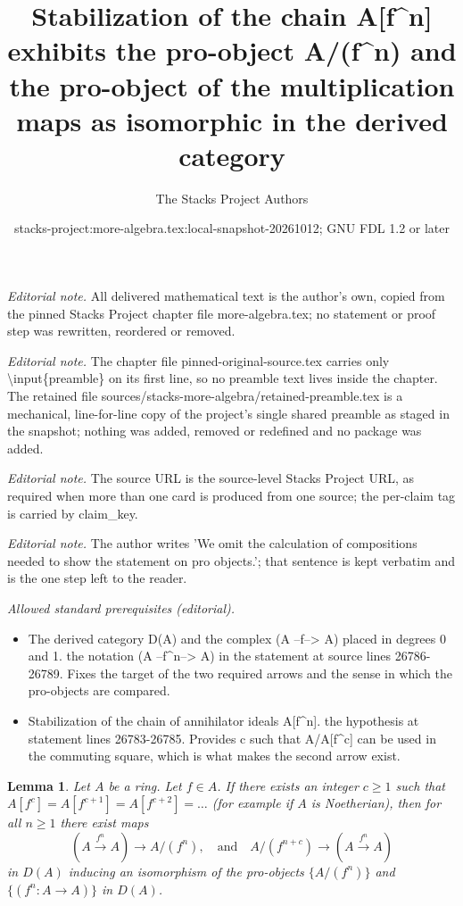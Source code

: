 \documentclass[10pt,a4paper]{amsart}
\title{Stabilization of the chain A[f\textasciicircum{}n] exhibits the pro-object A/(f\textasciicircum{}n) and the pro-object of the multiplication maps as isomorphic in the derived category}
\author{The Stacks Project Authors}
\date{stacks-project:more-algebra.tex:local-snapshot-20261012; GNU FDL 1.2 or later}
\theoremstyle{plain}
\newtheorem{lemma}[subsection]{Lemma}
\theoremstyle{definition}
\theoremstyle{remark}
\numberwithin{equation}{subsection}
\begin{document}
\maketitle
\setcounter{subsection}{1}
\noindent\textit{Editorial note.} All delivered mathematical text is the author's own, copied from the pinned Stacks Project chapter file more-algebra.tex; no statement or proof step was rewritten, reordered or removed.\par\medskip
\noindent\textit{Editorial note.} The chapter file pinned-original-source.tex carries only \textbackslash{}input\{preamble\} on its first line, so no preamble text lives inside the chapter. The retained file sources/stacks-more-algebra/retained-preamble.tex is a mechanical, line-for-line copy of the project's single shared preamble as staged in the snapshot; nothing was added, removed or redefined and no package was added.\par\medskip
\noindent\textit{Editorial note.} The source URL is the source-level Stacks Project URL, as required when more than one card is produced from one source; the per-claim tag is carried by claim\_key.\par\medskip
\noindent\textit{Editorial note.} The author writes 'We omit the calculation of compositions needed to show the statement on pro objects.'; that sentence is kept verbatim and is the one step left to the reader.\par\medskip
\noindent\textit{Allowed standard prerequisites (editorial).}\begin{itemize}
\item The derived category D(A) and the complex (A --f--> A) placed in degrees 0 and 1. the notation (A --f\textasciicircum{}n--> A) in the statement at source lines 26786-26789. Fixes the target of the two required arrows and the sense in which the pro-objects are compared.
\item Stabilization of the chain of annihilator ideals A[f\textasciicircum{}n]. the hypothesis at statement lines 26783-26785. Provides c such that A/A[f\textasciicircum{}c] can be used in the commuting square, which is what makes the second arrow exist.
\end{itemize}\medskip
\begin{lemma}
\label{lemma-lift-universally}
Let $A$ be a ring. Let $f \in A$. If there exists an integer $c \geq 1$
such that $A[f^c] = A[f^{c + 1}] = A[f^{c + 2}] = \ldots$ (for example
if $A$ is Noetherian), then for all $n \geq 1$ there exist maps
$$
(A \xrightarrow{f^n} A) \longrightarrow A/(f^n),
\quad\text{and}\quad
A/(f^{n + c}) \longrightarrow (A \xrightarrow{f^n} A)
$$
in $D(A)$ inducing an isomorphism of the pro-objects $\{A/(f^n)\}$ and
$\{(f^n : A \to A)\}$ in $D(A)$.
\end{lemma}
\end{document}

